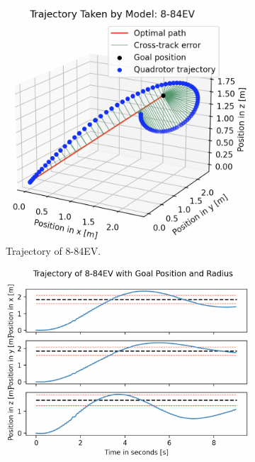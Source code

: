 \begin{figure}[H]
     \centering
     \begin{subfigure}[b]{0.48\textwidth}
         \centering
         \captionsetup{justification=centering}
         \includegraphics[width=\textwidth]{figures/5_/Testing/ppo_test_884EV1.png}
         \caption{Trajectory of 8-84EV.}
         \label{fig:testing_ppo884EV1}
     \end{subfigure} 
     \hfill 
    \begin{subfigure}[b]{0.49\textwidth}
         \centering
         \captionsetup{justification=centering}
         \includegraphics[width=\textwidth]{figures/5_/Testing/ppo_test_884EV2.png}

\end{subfigure}
\end{figure}

